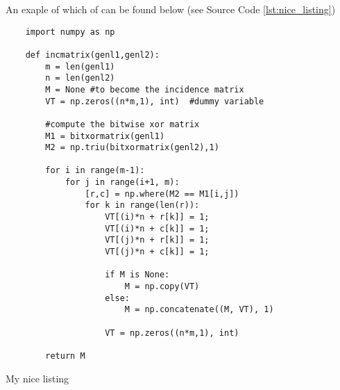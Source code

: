 An exaple of which of can be found below (see Source Code \ref{lst:nice_listing})
\begin{listing}
	\begin{verbatim} 
	import numpy as np
	
	def incmatrix(genl1,genl2):
	    m = len(genl1)
	    n = len(genl2)
	    M = None #to become the incidence matrix
	    VT = np.zeros((n*m,1), int)  #dummy variable
	
	    #compute the bitwise xor matrix
	    M1 = bitxormatrix(genl1)
	    M2 = np.triu(bitxormatrix(genl2),1)
	
	    for i in range(m-1):
	        for j in range(i+1, m):
	            [r,c] = np.where(M2 == M1[i,j])
	            for k in range(len(r)):
	                VT[(i)*n + r[k]] = 1;
	                VT[(i)*n + c[k]] = 1;
	                VT[(j)*n + r[k]] = 1;
	                VT[(j)*n + c[k]] = 1;
	
	                if M is None:
	                    M = np.copy(VT)
	                else:
	                    M = np.concatenate((M, VT), 1)
	
	                VT = np.zeros((n*m,1), int)
	
	    return M
	\end{verbatim}

  \caption{My nice listing}
  \label{lst:nice_listing}
\end{listing}
